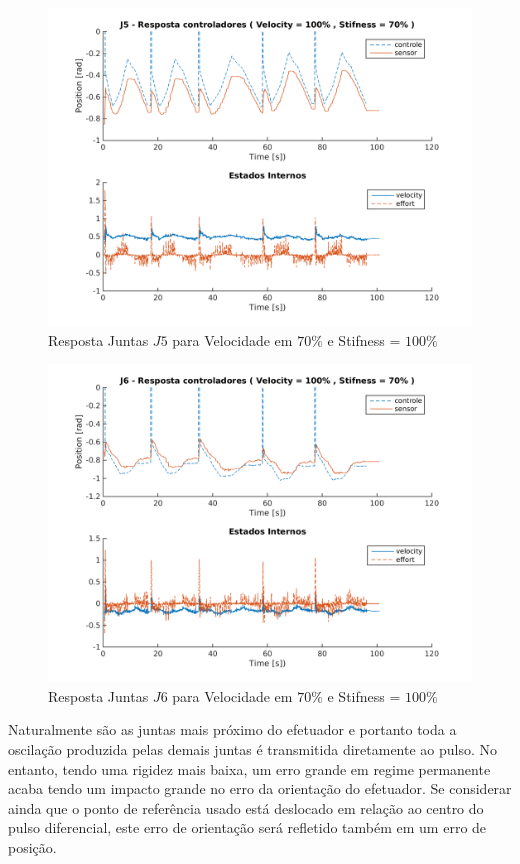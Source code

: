 \vspace{1cm}

\begin{figure}[H]
    \centering
    \includegraphics[width=0.6\linewidth,trim={2cm 1cm 2cm 2cm}]{tex/figs/squareStiffJ9stateEval_J5v100s70.png}
    \caption{Resposta Juntas $J5$ para Velocidade em $70\%$ e Stifness = $100\%$ }
    \label{fig:squareStiffJ9stateEval_J5v100s70}
\end{figure}

\vspace{1cm}

\begin{figure}[H]
    \centering
    \includegraphics[width=0.6\linewidth,trim={2cm 1cm 2cm 2cm}]{tex/figs/squareStiffJ9stateEval_J6v100s70.png}
    \caption{Resposta Juntas $J6$ para Velocidade em $70\%$ e Stifness = $100\%$ }
    \label{fig:squareStiffJ9stateEval_J6v100s70}
\end{figure}

Naturalmente são as juntas mais próximo do efetuador e portanto toda a oscilação produzida pelas demais juntas é transmitida diretamente ao pulso. No entanto, tendo uma rigidez mais baixa, um erro grande em regime permanente acaba tendo um impacto grande no erro da orientação do efetuador. Se considerar ainda que o ponto de referência usado está deslocado em relação ao centro do pulso diferencial, este erro de orientação será refletido também em um erro de posição.

